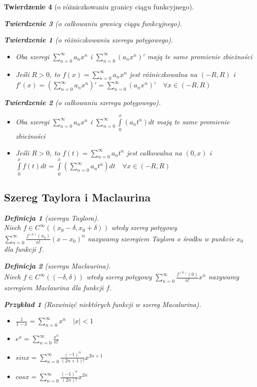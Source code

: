 \documentclass[12pt,a4paper]{article}
\newtheorem{tw}{Twierdzenie}
\newtheorem{przyklad}{Przykład}
\theoremstyle{definition}
\newtheorem{df}{Definicja}
\begin{document}
\begin{tw}[o różniczkowaniu granicy ciągu funkcyjnego]
\begin{tw}[o całkowaniu granicy ciągu funkcyjnego]
\begin{tw}[o różniczkowaniu szeregu potęgowego]~\\
\begin{itemize}
	\item Oba szeregi $\sum\limits_{n=0}^\infty a_nx^n$ i $\sum\limits_{n=0}^\infty (a_nx^n)'$ mają te same promienie zbieżności
	\item Jeśli $R > 0$, to $f(x) = \sum\limits_{n=0}^\infty a_nx^n$ jest różniczkowalna na $(-R, R)$ i $f'(x) = (\sum\limits_{n=0}^\infty a_nx^n)' = \sum\limits_{n=0}^\infty (a_nx^n)' \quad \forall x\in (-R,R)$
\end{itemize}
\end{tw}

\begin{tw}[o całkowaniu szeregu potęgowego]~\\
\begin{itemize}
	\item Oba szeregi $\sum\limits_{n=0}^\infty a_nx^n$ i $\sum\limits_{n=0}^\infty \int\limits_0^x (a_nt^n)dt$ mają te same promienie zbieżności
	\item Jeśli $R > 0$, to $f(t) = \sum\limits_{n=0}^\infty a_nt^n$ jest całkowalna na $(0, x)$ i $\int\limits_0^x f(t)dt = \int\limits_0^x(\sum\limits_{n=0}^\infty a_nt^n)dt \quad \forall x\in (-R,R)$
\end{itemize}
\end{tw}

\subsection{Szereg Taylora i Maclaurina}
\begin{df}[szeregu Taylora]~\\
Niech $f\in C^\infty ((x_0-\delta, x_0+\delta))$ wtedy szereg potęgowy $\sum\limits_{n=0}^\infty \frac{f^{(n)}(x_0)}{n!}(x-x_0)^n$ nazywamy szeregiem Taylora o środku w punkcie $x_0$ dla funkcji $f$.
\end{df}

\begin{df}[szeregu Maclaurina]~\\
Niech $f\in C^\infty ((-\delta, \delta))$ wtedy szereg potęgowy $\sum\limits_{n=0}^\infty \frac{f^{(n)}(0)}{n!}x^n$ nazywamy szeregiem Maclaurina dla funkcji $f$.
\end{df}

\begin{przyklad}[Rozwinięć niektórych funkcji w szereg Macalurina]~\\
\begin{itemize}
	\item $\frac{1}{1-x} = \sum\limits_{n=0}^\infty x^n \quad |x| < 1$
	\item $e^x = \sum\limits_{n=0}^\infty \frac{x^n}{n!}$
	\item $sinx = \sum\limits_{n=0}^\infty \frac{(-1)^n}{(2n+1)!}x^{2n+1}$
	\item $cosx = \sum\limits_{n=0}^\infty \frac{(-1)^n}{(2n)!}x^{2n}$
\end{itemize}


\end{przyklad}
\end{tw}
\end{tw}
\end{document}
